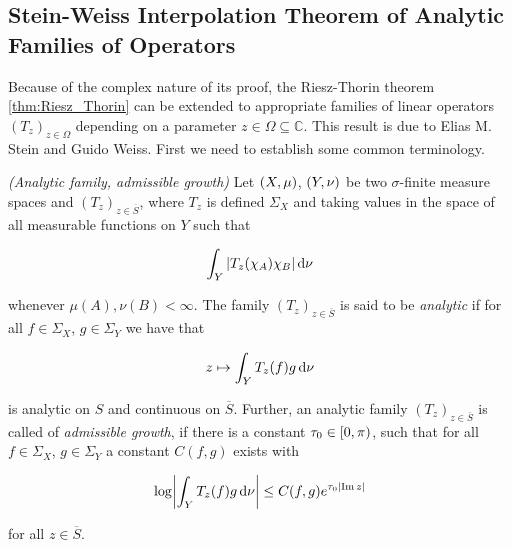 \subsection{Stein-Weiss Interpolation Theorem of Analytic Families of Operators}
Because of the complex nature of its proof, the Riesz-Thorin theorem \ref{thm:Riesz_Thorin} can be extended to appropriate families of linear operators $(T_z)_{z \in \Omega}$ depending on a parameter $z \in \Omega \subseteq \mathbb{C}$. This result is due to Elias M. Stein and Guido Weiss. First we need to establish some common terminology.  

\vspace{2mm}

\begin{mdframed}
	\begin{definition}\emph{(Analytic family, admissible growth)}
		Let $\del{X,\mu}$, $\del{Y,\nu}$ be two $\sigma$-finite measure spaces and $( T_z )_{z \in \overline{S}}$, where $T_z$ is defined $\Sigma_X$ and taking values in the space of all measurable functions on $Y$ such that

		\begin{equation}
			\int_Y \abs[0]{ T_z(\chi_A)\chi_B} \d\nu
		\end{equation}

		\noindent whenever $\mu(A),\nu(B) < \infty$. The family $( T_z )_{z \in \overline{S}}$ is said to be \emph{analytic} if for all $f \in \Sigma_X$, $g \in \Sigma_Y$ we have that

		\begin{equation}
			z \mapsto \int_Y T_z(f)g\mathop{}\!\mathrm{d}\nu
		\end{equation}

		\noindent is analytic on $S$ and continuous on $\overline{S}$. Further, an analytic family $( T_z )_{z \in \overline{S}}$ is called of \emph{admissible growth}, if there is a constant $\tau_0 \in \intco{0,\pi}$, such that for all $f \in \Sigma_X$, $g \in \Sigma_Y$ a constant $C(f,g)$ exists with

			\begin{equation}
				\log\abs[3]{ \int_Y T_z(f) g \d\nu} \leq C(f,g)e^{\tau_0\abs[0]{ \Im z}}
			\end{equation}

			\noindent for all $z \in \overline{S}$.
	\end{definition}
\end{mdframed}

\vspace{2mm}

